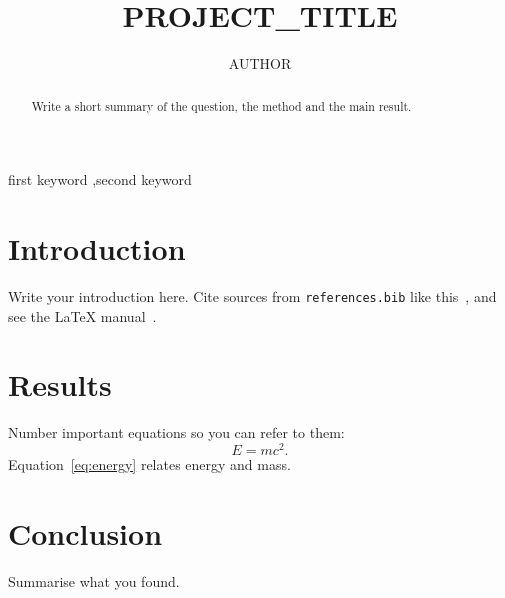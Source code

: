 \documentclass[preprint,12pt]{elsarticle}
\begin{document}
\begin{frontmatter}
\title{{{PROJECT_TITLE}}}
\author[1]{{{AUTHOR}}}

\begin{abstract}
Write a short summary of the question, the method and the main result.
\end{abstract}

\begin{keyword}
first keyword \sep second keyword
\end{keyword}
\end{frontmatter}

\section{Introduction}
Write your introduction here. Cite sources from \texttt{references.bib} like
this~\cite{einstein1905}, and see the \LaTeX{} manual~\cite{lamport1994}.

\section{Results}
Number important equations so you can refer to them:
\begin{equation}
  E = mc^2 . \label{eq:energy}
\end{equation}
Equation~\eqref{eq:energy} relates energy and mass.

\section{Conclusion}
Summarise what you found.



\end{document}
